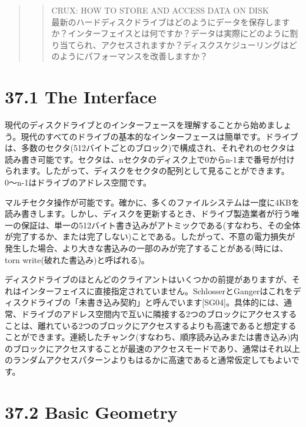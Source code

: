 \begin{quote}
\begin{quote}
CRUX: HOW TO STORE AND ACCESS DATA ON DISK\\
最新のハードディスクドライブはどのようにデータを保存しますか？インターフェイスとは何ですか？データは実際にどのように割り当てられ、アクセスされますか？ディスクスケジューリングはどのようにパフォーマンスを改善しますか？
\end{quote}
\end{quote}

\hypertarget{the-interface}{%
\section*{37.1 The Interface}\label{the-interface}}

現代のディスクドライブとのインターフェースを理解することから始めましょう。現代のすべてのドライブの基本的なインターフェースは簡単です。ドライブは、多数のセクタ(512バイトごとのブロック)で構成され、それぞれのセクタは読み書き可能です。セクタは、nセクタのディスク上で0からn-1まで番号が付けられます。したがって、ディスクをセクタの配列として見ることができます。0〜n-1はドライブのアドレス空間です。

マルチセクタ操作が可能です。確かに、多くのファイルシステムは一度に4KBを読み書きします。しかし、ディスクを更新するとき、ドライブ製造業者が行う唯一の保証は、単一の512バイト書き込みがアトミックである(すなわち、その全体が完了するか、または完了しない)ことである。したがって、不意の電力損失が発生した場合、より大きな書込みの一部のみが完了することがある(時には、torn
write(破れた書込み)と呼ばれる)。

ディスクドライブのほとんどのクライアントはいくつかの前提がありますが、それはインターフェイスに直接指定されていません。SchlosserとGangerはこれをディスクドライブの「未書き込み契約」と呼んでいます{[}SG04{]}。具体的には、通常、ドライブのアドレス空間内で互いに隣接する2つのブロックにアクセスすることは、離れている2つのブロックにアクセスするよりも高速であると想定することができます。連続したチャンク(すなわち、順序読み込みまたは書き込み)内のブロックにアクセスすることが最速のアクセスモードであり、通常はそれ以上のランダムアクセスパターンよりもはるかに高速であると通常仮定してもよいです。

\hypertarget{basic-geometry}{%
\section*{37.2 Basic Geometry}\label{basic-geometry}}

